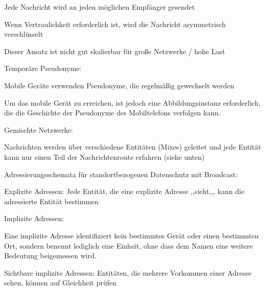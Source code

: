 \documentclass[a4paper]{article}
\begin{document}
\begin{multicols}{3}
\begin{itemize*}
\begin{itemize*}
                  \begin{itemize*}
                        \item Jede Nachricht wird an jeden möglichen Empfänger gesendet
                        \item Wenn Vertraulichkeit erforderlich ist, wird die Nachricht asymmetrisch verschlüsselt
                        \item Dieser Ansatz ist nicht gut skalierbar für große Netzwerke / hohe Last
                  \end{itemize*}
                  \item Temporäre Pseudonyme:
                  \begin{itemize*}
                        \item Mobile Geräte verwenden Pseudonyme, die regelmäßig gewechselt werden
                        \item Um das mobile Gerät zu erreichen, ist jedoch eine Abbildungsinstanz erforderlich, die die Geschichte der Pseudonyme des Mobiltelefons verfolgen kann.
                  \end{itemize*}
                  \item Gemischte Netzwerke:
                  \begin{itemize*}
                        \item Nachrichten werden über verschiedene Entitäten (Mixes) geleitet und jede Entität kann nur einen Teil der Nachrichtenroute erfahren (siehe unten)
                  \end{itemize*}
            \end{itemize*}
            \item Adressierungsschemata für standortbezogenen Datenschutz mit Broadcast:
            \begin{itemize*}
                  \item Explizite Adressen: Jede Entität, die eine explizite Adresse ,,sieht,,, kann die adressierte Entität bestimmen
            \end{itemize*}
            \item Implizite Adressen:
            \begin{itemize*}
                  \item Eine implizite Adresse identifiziert kein bestimmtes Gerät oder einen bestimmten Ort, sondern benennt lediglich eine Einheit, ohne dass dem Namen eine weitere Bedeutung beigemessen wird.
                  \item Sichtbare implizite Adressen: Entitäten, die mehrere Vorkommen einer Adresse sehen, können auf Gleichheit prüfen

\end{itemize*}
\end{itemize*}
\end{multicols}
\end{document}
